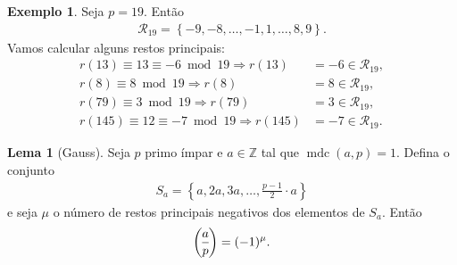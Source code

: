 \documentclass[a4paper,11pt,twoside, leqno]{article}
\DeclareMathOperator{\mdc}{mdc}
\newcommand{\genlegendre}[4]{%
	\genfrac{(}{)}{}{#1}{#3}{#4}%
	\if\relax\detokenize{#2}\relax\else_{\!#2}\fi
}
\newcommand{\legendre}[3][]{\genlegendre{}{#1}{#2}{#3}}
\theoremstyle{definition}
\newtheorem{lemma}[theorem]{Lema}
\newtheorem*{example}{Exemplo}
\begin{document}
\begin{example}
	Seja $p=19$. Então
	\begin{align*}
	\mathcal{R}_{19} = \left\{ -9,-8,\dots,-1,1,\dots,8,9 \right\}.
	\end{align*}
	Vamos calcular alguns restos principais:
	\begin{align*}
	r(13) \equiv 13\equiv -6\bmod 19 \Rightarrow r(13) &= -6\in\mathcal{R}_{19}, \\
	r(8) \equiv 8\bmod 19 \Rightarrow r(8) &= 8\in\mathcal{R}_{19}, \\
	r(79) \equiv 3\bmod 19 \Rightarrow r(79) &= 3\in\mathcal{R}_{19}, \\
	r(145) \equiv 12\equiv -7\bmod 19 \Rightarrow r(145) &= -7\in\mathcal{R}_{19}. 
	\end{align*}
\end{example}
\begin{lemma}[Gauss]
	\label{lema 89}
	Seja $p$ primo ímpar e $a\in\mathbb{Z}$ tal que $\mdc(a,p) = 1$. Defina o conjunto
	\begin{align*}
	S_a = \left\{ a,2a,3a,\dots,\frac{p-1}{2}\cdot a \right\}
	\end{align*}
	e seja $\mu$ o número de restos principais negativos dos elementos de $S_a$. Então
	\begin{align*}
	\legendre[]{a}{p} = (-1)^{\mu}.
	\end{align*}
\end{lemma}
\end{document}
